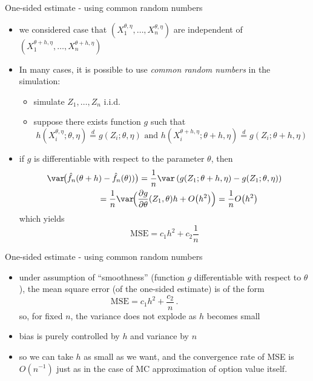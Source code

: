 \documentclass[pdf, handout]{beamer}
\begin{document}
\begin{frame}{One-sided estimate - using common random numbers}
\begin{itemize}
\item we considered case that $(X_1^{\theta,\eta},\dots,X_n^{\theta,\eta})$ are independent of
$(X_1^{\theta+h,\eta},\dots,X_n^{\theta+h,\eta})$
\item In many cases, it is possible to use \emph{common random numbers} in the simulation: 
\begin{itemize}
\item simulate $Z_1,\dots,Z_n$ i.i.d.
\item suppose there exists function $g$ such that
\[
h(X_i^{\theta,\eta};\theta,\eta) 
\stackrel{d}{=} g(Z_i;\theta,\eta) \text{ and }
h(X_i^{\theta+h,\eta};\theta+h,\eta)\stackrel{d}{=} g(Z_i;\theta+h,\eta)
\]
\end{itemize}
\item if $g$ is differentiable with respect to the parameter $\theta$,
then
\begin{align*}
\var\!\big(
\hat f_n(\theta+h) -  \hat f_n(\theta)
)\big)= \frac{1}{n}\var\left(
g(Z_1;\theta+h,\eta) - g(Z_1;\theta,\eta)
\right)
 \\
= \frac{1}{n}  \var\!\Big( \frac{\partial g}{\partial \theta} (Z_1,\theta)h + O\big(h^2\big)\Big)
= \frac{1}{n}O\big(h^2\big) \hspace{1cm}
\end{align*}
which yields 
\[
\text{MSE} = c_1 h^2 + c_2  \frac{1}{n}
\]
\end{itemize}
\end{frame}

\begin{frame}{One-sided estimate - using common random numbers}
\begin{itemize}
\item under  assumption of ``smoothness''
(function $g$ differentiable with respect to $\theta$), the mean square error (of the one-sided estimate)
is of the form  
$$
\text{MSE} = c_1 h^2 + \frac{c_2}{n}\,. \hspace{2cm}
$$
so, for fixed $n$, the variance does not explode as $h$ becomes small
\item 
bias is purely controlled by $h$ and variance by $n$ 
\item so we can take
$h$ as small as we want, and the convergence
rate of MSE is $O(n^{-1})$ just as in the case of MC approximation of option value itself.
\end{itemize}
\end{frame}
\end{document}
